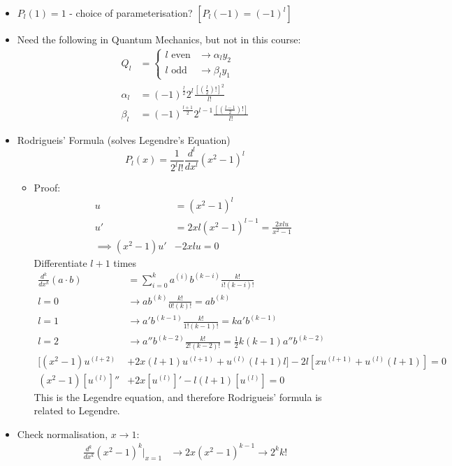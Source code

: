 \documentclass[Maths.tex]{subfiles}
\begin{document}
\begin{itemize}
\begin{itemize}
\begin{equation}
        \end{equation}
    \end{itemize}
    \item $P_l(1) = 1$ - choice of parameterisation? $[P_l(-1) = (-1)^l]$
    \item Need the following in Quantum Mechanics, but not in this course:
    \begin{align}
        Q_l &= \begin{cases} l \text{ even} & \to \alpha_ly_2 \\ l\text{ odd} & \to \beta_ly_1 \end{cases} \\
        \alpha_l &= (-1)^{\frac{l}{2}}2^l \frac{\left[\left(\frac{l}{2}\right)!\right]^2}{l!} \\
        \beta_l &= (-1)^{\frac{l+1}{2}}2^{l-1}\frac{\left[\left(\frac{l-1}{2}\right)!\right]}{l!}
    \end{align}
    \item Rodrigueis' Formula (solves Legendre's Equation)
    \begin{equation}
        P_l(x) = \frac{1}{2^l l!}\frac{d^l}{dx^l}(x^2 - 1)^l
    \end{equation}
    \begin{itemize}
        \item Proof:
        \begin{align}
            u &= (x^2 - 1)^l \\
            u' &= 2xl(x^2 - 1)^{l-1} = \frac{2xlu}{x^2 - 1} \\
            \implies (x^2 - 1)u' &- 2xlu = 0
        \end{align}
        Differentiate $l+1$ times
        \begin{align}
            \frac{d^k}{dx^k} (a\cdot b) &= \sum_{i=0}^k a^{(i)}b^{(k-i)}\frac{k!}{i!(k-i)!} \\
            l = 0 &\to ab^{(k)}\frac{k!}{0!(k)!} = ab^{(k)} \\
            l = 1 &\to a'b^{(k-1)}\frac{k!}{1!(k-1)!} = ka'b^{(k-1)} \\
            l = 2 &\to a''b^{(k-2)}\frac{k!}{2!(k-2)!} = \frac{1}{2}k(k-1)a''b^{(k-2)} \\
            [(x^2 -1)u^{(l+2)} &+ 2x(l+1)u^{(l+1)} + u^{(l)}(l+1)l] - 2l[xu^{(l+1)} + u^{(l)}(l+1)] = 0 \\
            (x^2 - 1)[u^{(l)}]'' &+ 2x[u^{(l)}]' - l(l+1)[u^{(l)}] = 0
        \end{align}
        This is the Legendre equation, and therefore Rodrigueis' formula is related to Legendre.
    \end{itemize}
    \item Check normalisation, $x\to1$:
    \begin{align}
        \frac{d^k}{dx^k} (x^2 - 1)^k\Big|_{x=1} &\to 2x(x^2 - 1)^{k-1} \to 2^kk!
    \end{align}
\end{itemize}
\end{document}
